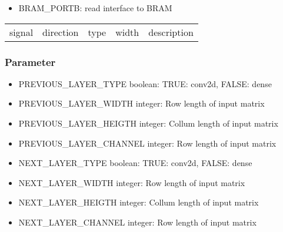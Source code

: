 \begin{itemize}
	\item BRAM\_PORTB: read interface to BRAM
\end{itemize}
\begin{tabular}{|l|l|l|l|l|}
	
	signal & direction & type & width & description\\
	
\end{tabular}

\subsubsection{Parameter}
\begin{itemize}
	\item PREVIOUS\_LAYER\_TYPE boolean: {TRUE: conv2d, FALSE: dense} %
	\item PREVIOUS\_LAYER\_WIDTH integer: {Row length of input matrix} 
	\item PREVIOUS\_LAYER\_HEIGTH integer: {Collum length of input matrix}
	\item PREVIOUS\_LAYER\_CHANNEL integer: {Row length of input matrix}
	\item NEXT\_LAYER\_TYPE boolean: {TRUE: conv2d, FALSE: dense} %
	\item NEXT\_LAYER\_WIDTH integer: {Row length of input matrix} 
	\item NEXT\_LAYER\_HEIGTH integer: {Collum length of input matrix}
	\item NEXT\_LAYER\_CHANNEL integer: {Row length of input matrix}
\end{itemize}

